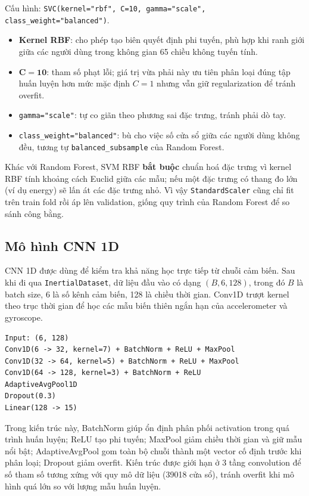 \documentclass[12pt,a4paper]{article}
\begin{document}
Cấu hình: \texttt{SVC(kernel="rbf", C=10, gamma="scale", class\_weight="balanced")}.

\begin{itemize}
    \item \textbf{Kernel RBF}: cho phép tạo biên quyết định phi tuyến, phù hợp khi ranh giới giữa các người dùng trong không gian 65 chiều không tuyến tính.
    \item \(\mathbf{C=10}\): tham số phạt lỗi; giá trị vừa phải này ưu tiên phân loại đúng tập huấn luyện hơn mức mặc định \(C=1\) nhưng vẫn giữ regularization để tránh overfit.
    \item \texttt{gamma="scale"}: tự co giãn theo phương sai đặc trưng, tránh phải dò tay.
    \item \texttt{class\_weight="balanced"}: bù cho việc số cửa sổ giữa các người dùng không đều, tương tự \texttt{balanced\_subsample} của Random Forest.
\end{itemize}

Khác với Random Forest, SVM RBF \textbf{bắt buộc} chuẩn hoá đặc trưng vì kernel RBF tính khoảng cách Euclid giữa các mẫu; nếu một đặc trưng có thang đo lớn (ví dụ energy) sẽ lấn át các đặc trưng nhỏ. Vì vậy \texttt{StandardScaler} cũng chỉ fit trên train fold rồi áp lên validation, giống quy trình của Random Forest để so sánh công bằng.

\subsection{Mô hình CNN 1D}

CNN 1D được dùng để kiểm tra khả năng học trực tiếp từ chuỗi cảm biến. Sau khi đi qua \texttt{InertialDataset}, dữ liệu đầu vào có dạng \((B, 6, 128)\), trong đó \(B\) là batch size, 6 là số kênh cảm biến, 128 là chiều thời gian. Conv1D trượt kernel theo trục thời gian để học các mẫu biến thiên ngắn hạn của accelerometer và gyroscope.

\begin{lstlisting}
Input: (6, 128)
Conv1D(6 -> 32, kernel=7) + BatchNorm + ReLU + MaxPool
Conv1D(32 -> 64, kernel=5) + BatchNorm + ReLU + MaxPool
Conv1D(64 -> 128, kernel=3) + BatchNorm + ReLU
AdaptiveAvgPool1D
Dropout(0.3)
Linear(128 -> 15)
\end{lstlisting}

Trong kiến trúc này, BatchNorm giúp ổn định phân phối activation trong quá trình huấn luyện; ReLU tạo phi tuyến; MaxPool giảm chiều thời gian và giữ mẫu nổi bật; AdaptiveAvgPool gom toàn bộ chuỗi thành một vector cố định trước khi phân loại; Dropout giảm overfit. Kiến trúc được giới hạn ở 3 tầng convolution để số tham số tương xứng với quy mô dữ liệu (39018 cửa sổ), tránh overfit khi mô hình quá lớn so với lượng mẫu huấn luyện.
\end{document}
